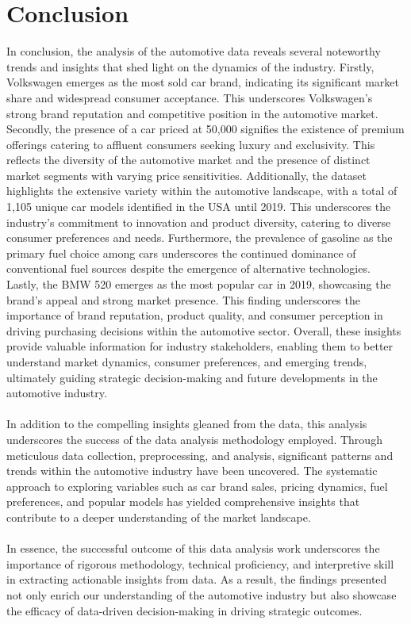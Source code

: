 \documentclass{article}
\begin{document}
\section{Conclusion}
\vspace{1cm}
{\fontsize{15}{15}\selectfont

In conclusion, the analysis of the automotive data reveals several noteworthy trends and insights that shed light on the dynamics of the industry. Firstly, Volkswagen emerges as the most sold car brand, indicating its significant market share and widespread consumer acceptance. This underscores Volkswagen's strong brand reputation and competitive position in the automotive market. Secondly, the presence of a car priced at \text{\$}50,000 signifies the existence of premium offerings catering to affluent consumers seeking luxury and exclusivity. This reflects the diversity of the automotive market and the presence of distinct market segments with varying price sensitivities. Additionally, the dataset highlights the extensive variety within the automotive landscape, with a total of 1,105 unique car models identified in the USA until 2019. This underscores the industry's commitment to innovation and product diversity, catering to diverse consumer preferences and needs. Furthermore, the prevalence of gasoline as the primary fuel choice among cars underscores the continued dominance of conventional fuel sources despite the emergence of alternative technologies. Lastly, the BMW 520 emerges as the most popular car in 2019, showcasing the brand's appeal and strong market presence. This finding underscores the importance of brand reputation, product quality, and consumer perception in driving purchasing decisions within the automotive sector. Overall, these insights provide valuable information for industry stakeholders, enabling them to better understand market dynamics, consumer preferences, and emerging trends, ultimately guiding strategic decision-making and future developments in the automotive industry.
\\
\\
In addition to the compelling insights gleaned from the data, this analysis underscores the success of the data analysis methodology employed. Through meticulous data collection, preprocessing, and analysis, significant patterns and trends within the automotive industry have been uncovered. The systematic approach to exploring variables such as car brand sales, pricing dynamics, fuel preferences, and popular models has yielded comprehensive insights that contribute to a deeper understanding of the market landscape.
\\
\\
In essence, the successful outcome of this data analysis work underscores the importance of rigorous methodology, technical proficiency, and interpretive skill in extracting actionable insights from data. As a result, the findings presented not only enrich our understanding of the automotive industry but also showcase the efficacy of data-driven decision-making in driving strategic outcomes.
}
\end{document}
